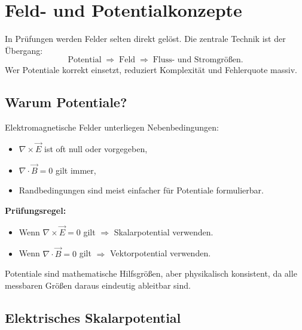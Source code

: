 \documentclass[a4paper]{article}
\newcommand{\imp}[1]{{\color{accent}\bfseries #1}}
\newcommand{\E}{\vec E}
\newcommand{\B}{\vec B}
\begin{document}
\section{Feld- und Potentialkonzepte}

\begin{merke}
In Prüfungen werden Felder selten direkt gelöst.
Die zentrale Technik ist der Übergang:
\[
\text{Potential} \;\Rightarrow\; \text{Feld} \;\Rightarrow\; \text{Fluss- und Stromgrößen}.
\]
Wer Potentiale korrekt einsetzt, reduziert Komplexität und Fehlerquote massiv.
\end{merke}

\subsection{Warum Potentiale?}

Elektromagnetische Felder unterliegen Nebenbedingungen:
\begin{itemize}
  \item $\nabla \times \E$ ist oft null oder vorgegeben,
  \item $\nabla \cdot \B = 0$ gilt immer,
  \item Randbedingungen sind meist einfacher für Potentiale formulierbar.
\end{itemize}

\begin{schema}
\imp{Prüfungsregel:}
\begin{itemize}
  \item Wenn $\nabla \times \E = 0$ gilt $\Rightarrow$ Skalarpotential verwenden.
  \item Wenn $\nabla \cdot \B = 0$ gilt $\Rightarrow$ Vektorpotential verwenden.
\end{itemize}
\end{schema}

Potentiale sind mathematische Hilfsgrößen, aber physikalisch konsistent,
da alle messbaren Größen daraus eindeutig ableitbar sind.

\subsection{Elektrisches Skalarpotential}
\end{document}
